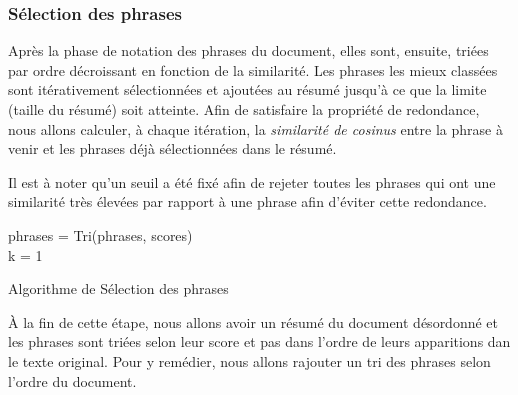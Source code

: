         \subsubsection{Sélection des phrases}
       Après la phase de notation des phrases du document, elles sont, ensuite, triées par ordre décroissant en fonction de la similarité. Les phrases les mieux classées sont itérativement sélectionnées et ajoutées au résumé jusqu'à ce que la limite (taille du résumé) soit atteinte. Afin de satisfaire la propriété de redondance, nous allons calculer, à chaque itération, la \emph{similarité de cosinus} entre la phrase à venir et les phrases déjà sélectionnées dans le résumé.

       Il est à noter qu'un seuil a été fixé afin de rejeter toutes les phrases qui ont une similarité très élevées par rapport à une phrase afin d'éviter cette redondance.

        \begin{algorithm2e}[H]
            \SetAlgoLined
            phrases = Tri(phrases, scores)\\
            k = 1\\
            \caption{Algorithme de Sélection des phrases}
        \end{algorithm2e}

        À la fin de cette étape, nous allons avoir un résumé du document désordonné et les phrases sont triées selon leur score et pas dans l'ordre de leurs apparitions dan le texte original. Pour y remédier, nous allons rajouter un tri des phrases selon l'ordre du document.
        
